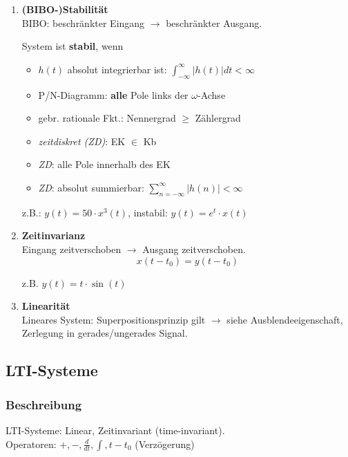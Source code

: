 \begin{enumerate}
  \item {\textbf{(BIBO-)Stabilit\"at}}\\
  \small BIBO: beschr\"ankter Eingang $\rightarrow$ beschr\"ankter Ausgang.\\
\begin{mdframed}[style=exercise]
   System ist \textbf{stabil}, wenn
   \begin{itemize}
   	   \item $h(t)$ absolut integrierbar ist: $\int_{-\infty}^{\infty} |h(t)| dt <\infty$
   	   \item P/N-Diagramm: \textbf{alle} Pole links der $\omega$-Achse
   	   \item gebr. rationale Fkt.: Nennergrad $\ge$ Zählergrad
   	   \item \textit{zeitdiskret (ZD)}: EK $\in$ Kb
   	   \item \textit{ZD}: alle Pole innerhalb
   	   des EK
   	    \item \textit{ZD}: absolut summierbar: $\sum_{n=-\infty}^{\infty} |h(n)|<\infty$
   \end{itemize}
   z.B.: $y(t) = 50\cdot x^3(t)$, instabil: $y(t) = e^{t}\cdot x(t)$
  \end{mdframed}
  \normalsize
  \item{\textbf{Zeitinvarianz}}\\
		{\small
		  	Eingang zeitverschoben $\rightarrow$ Ausgang zeitverschoben.
		}
		\[ 
		x(t-t_0) = y(t-t_0)
		 \]
		 
		 {\small z.B. $y(t)=t\cdot \sin(t)$}
  \item{\textbf{Linearit\"at}}\\
		  {\small
		      Lineares System: Superpositionsprinzip gilt $\rightarrow$ siehe Ausblendeeigenschaft, Zerlegung in gerades/ungerades Signal.
		  }
\end{enumerate}
\normalsize
\subsection{LTI-Systeme}
\subsubsection{Beschreibung}
LTI-Systeme: Linear, Zeitinvariant (time-invariant).\\
Operatoren: $+, -, \frac{d}{dt}, \int, t-t_0$ (Verz\"ogerung)\\

